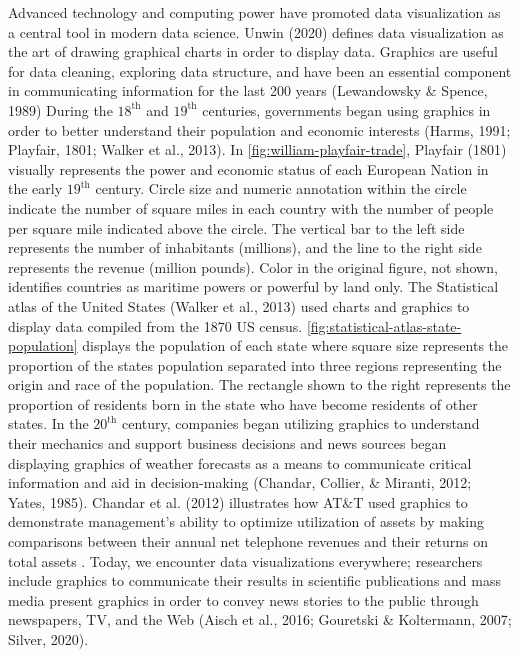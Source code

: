 \documentclass[print]{nuthesis}
\begin{document}
Advanced technology and computing power have promoted data visualization as a central tool in modern data science. Unwin (2020) defines data visualization as the art of drawing graphical charts in order to display data.
Graphics are useful for data cleaning, exploring data structure, and have been an essential component in communicating information for the last 200 years (Lewandowsky \& Spence, 1989)
During the \(\text{18}^{\text{th}}\) and \(\text{19}^{\text{th}}\) centuries, governments began using graphics in order to better understand their population and economic interests (Harms, 1991; Playfair, 1801; Walker et al., 2013).
In \cref{fig:william-playfair-trade}, Playfair (1801) visually represents the power and economic status of each European Nation in the early \(\text{19}^{\text{th}}\) century.
Circle size and numeric annotation within the circle indicate the number of square miles in each country with the number of people per square mile indicated above the circle.
The vertical bar to the left side represents the number of inhabitants (millions), and the line to the right side represents the revenue (million pounds).
Color in the original figure, not shown, identifies countries as maritime powers or powerful by land only.
The Statistical atlas of the United States (Walker et al., 2013) used charts and graphics to display data compiled from the 1870 US census.
\cref{fig:statistical-atlas-state-population} displays the population of each state where square size represents the proportion of the states population separated into three regions representing the origin and race of the population.
The rectangle shown to the right represents the proportion of residents born in the state who have become residents of other states.
In the \(\text{20}^{\text{th}}\) century, companies began utilizing graphics to understand their mechanics and support business decisions and news sources began displaying graphics of weather forecasts as a means to communicate critical information and aid in decision-making (Chandar, Collier, \& Miranti, 2012; Yates, 1985).
Chandar et al. (2012) illustrates how AT\&T used graphics to demonstrate management's ability to optimize utilization of assets by making comparisons between their annual net telephone revenues and their returns on total assets .
Today, we encounter data visualizations everywhere; researchers include graphics to communicate their results in scientific publications and mass media present graphics in order to convey news stories to the public through newspapers, TV, and the Web (Aisch et al., 2016; Gouretski \& Koltermann, 2007; Silver, 2020).
\end{document}
